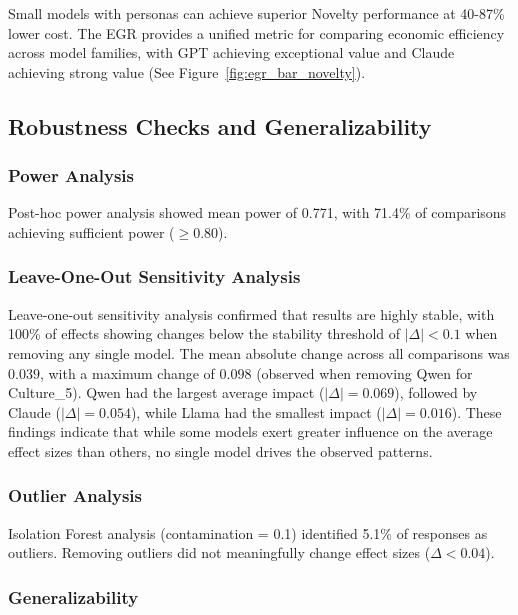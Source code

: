 \documentclass{article}
\begin{document}
Small models with personas can achieve superior Novelty performance at 40-87\% lower cost. The EGR provides a unified metric for comparing economic efficiency across model families, with GPT achieving exceptional value and Claude achieving strong value (See Figure~\ref{fig:egr_bar_novelty}).

\subsection{Robustness Checks and Generalizability}

\subsubsection{Power Analysis}

Post-hoc power analysis showed mean power of 0.771, with 71.4\% of comparisons achieving sufficient power ($\ge 0.80$).

\subsubsection{Leave-One-Out Sensitivity Analysis}

Leave-one-out sensitivity analysis confirmed that results are highly stable, with 100\% of effects showing changes below the stability threshold of $|\Delta| < 0.1$ when removing any single model. The mean absolute change across all comparisons was $0.039$, with a maximum change of $0.098$ (observed when removing Qwen for Culture\_5). Qwen had the largest average impact ($|\Delta| = 0.069$), followed by Claude ($|\Delta| = 0.054$), while Llama had the smallest impact ($|\Delta| = 0.016$). These findings indicate that while some models exert greater influence on the average effect sizes than others, no single model drives the observed patterns.

\subsubsection{Outlier Analysis}

Isolation Forest analysis (contamination = 0.1) identified 5.1\% of responses as outliers. Removing outliers did not meaningfully change effect sizes ($\Delta < 0.04$).

\subsubsection{Generalizability}
\end{document}
